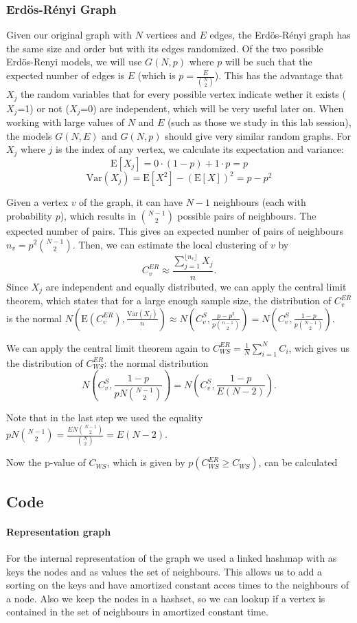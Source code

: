 \documentclass[paper=a4, fontsize=11pt]{scrartcl} %
\newcommand{\E}{\mathrm{E}}
\newcommand{\Var}{\mathrm{Var}}
\begin{document}
\subsubsection{Erdös-Rényi Graph}
Given our original graph with $N$ vertices and $E$ edges, the Erdös-Rényi graph has the same size and order but with its edges randomized.  Of the two possible Erdös-Renyi models, we will use $G(N,p)$ where $p$ will be such that the expected number of edges is $E$ (which is $p=\frac{E}{\binom{N}{2}}$). This has the advantage that $X_j$ the random variables that for every possible vertex indicate wether it exists ($X_j$=1) or not ($X_j$=0) are independent, which will be very useful later on. When working with large values of $N$ and $E$ (such as those we study in this lab session), the models $G(N,E)$ and $G(N,p)$ should give very similar random graphs. 
For $X_j$ where $j$ is the index of any vertex, we calculate its expectation and variance: 
$$\E[X_j]=0\cdot(1-p)+1\cdot p=p$$
$$\Var(X_j)=\E[X^2]-(\E[X])^2=p-p^2$$

Given a vertex $v$ of the graph, it can have $N-1$ neighbours (each with probability $p$), which results in $\binom{N-1}{2}$ possible pairs of neighbours. The expected number of pairs. This gives an expected number of pairs of neighbours $n_v=p^2\binom{N-1}{2}$.  Then, we can estimate the local clustering of $v$ by $$C_v^{ER}\approx \frac{\sum_{j=1}^{\lfloor n_v\rfloor}X_j}{n}.$$
Since $X_j$ are independent and equally distributed, we can apply the central limit theorem, which states that for a large enough sample size, the distribution of $C_v^{ER}$ is the normal $N(\E(C_v^{ER}),\frac{\Var(X_j)}{n})\approx N(C_v^S,\frac{p-p^2}{p\binom{n-1}{2}})=N(C_v^S,\frac{1-p}{p\binom{N-1}{2}})$. 

We can apply the central limit theorem again to $C_{WS}^{ER}=\frac{1}{N}\sum_{i=1}^NC_i$, wich gives us the distribution of $C_{WS}^{ER}$: the normal distribution $$N(C_v^S,\frac{1-p}{pN\binom{N-1}{2}})=N(C_v^S,\frac{1-p}{E(N-2)}).$$


Note that in the last step we used the equality $pN\binom{N-1}{2}=\frac{EN\binom{N-1}{2}}{\binom{N}{2}}=E(N-2)$.

Now the p-value of $C_{WS}$, which is given by $p(C_{WS}^{ER}\geq C_{WS})$, can be calculated

\subsection{Code}
\paragraph{Representation graph}
For the internal representation of the graph we used a linked hashmap with as keys the nodes and as values the set of neighbours. This allows us to add a sorting on the keys and have amortized constant acces times to the neighbours of a node. Also we keep the nodes in a hashset, so we can lookup if a vertex is contained in the set of neighbours in amortized constant time.
\end{document}
